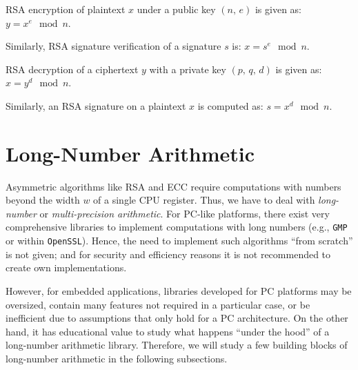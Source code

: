 \begin{definition}
 \label{def:rsa_enc}
\ac{RSA} encryption of plaintext $x$ under a public key  $\left(n,\,e\right)$ is given as: \\
$
y = x^e \mod n
$.

\noindent Similarly, \ac{RSA} signature verification of a signature $s$ is:
$
x = s^e \mod n
$.
\end{definition}

\begin{definition}
  \label{def:rsa_dec}
\ac{RSA} decryption of a ciphertext $y$ with a private key $\left(p,\,q,\,d\right)$ is given as: \\
$
x = y^d \mod n
$.

\noindent Similarly, an \ac{RSA} signature on a plaintext $x$ is computed as:
$
s = x^d \mod n
$.

\end{definition}

\section{Long-Number Arithmetic}
Asymmetric algorithms like \ac{RSA} and \ac{ECC} require computations with numbers beyond the width $w$ of a single \ac{CPU} register. Thus, we have to deal with \emph{long-number} or \emph{multi-precision arithmetic}. For \ac{PC}-like platforms, there exist very comprehensive libraries to implement computations with long numbers (e.g., \verb+GMP+ or within \verb+OpenSSL+). Hence, the need to implement such algorithms ``from scratch'' is not given; and for security and efficiency reasons it is not recommended to create own implementations.

However, for embedded applications, libraries developed for \ac{PC} platforms may be oversized, contain many features not required in a particular case, or be inefficient due to assumptions that only hold for a \ac{PC} architecture. On the other hand, it has educational value to study what happens ``under the hood'' of a long-number arithmetic library. Therefore, we will study a few building blocks of long-number arithmetic in the following subsections.

